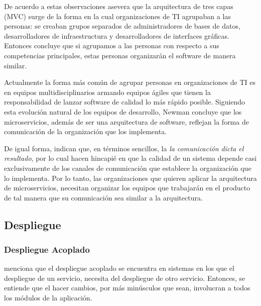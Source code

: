 
De acuerdo a estas observaciones \cite{newman2019monolith} asevera que la arquitectura de tres capas
(MVC) surge de la forma en la cual organizaciones de TI agrupaban a las personas: se creaban grupos
separados de administradores de bases de datos, desarrolladores de infraestructura y desarrolladores
de interfaces gráficas. Entonces concluye que si agrupamos a las personas con respecto a sus competencias
principales, estas personas organizarán el software de manera similar.

Actualmente la forma más común de agrupar personas en organizaciones de TI es en equipos multidisciplinarios
armando equipos ágiles que tienen la responsabilidad de lanzar software de calidad lo más rápido posible.
Siguiendo esta evolución natural de los equipos de desarrollo, Newman concluye que los microservicios,
además de ser una arquitectura de software, reflejan la forma de comunicación de la organización
que los implementa.

De igual forma, \cite{nadareishvili2016microservice} indican que, en términos sencillos, la
{\it la comunicación dicta el resultado}, por lo cual hacen hincapié en que la calidad de un sistema
depende casi exclusivamente de los canales de comunicación que establece la organización que lo implementa.
Por lo tanto, las organizaciones que quieren aplicar la arquitectura de microservicios, necesitan
organizar los equipos que trabajarán en el producto de tal manera que su comunicación sea similar a 
la arquitectura.


\subsection{Despliegue}


\subsubsection{Despliegue Acoplado}

\cite{newman2019monolith} menciona que el despliegue acoplado se encuentra en sistemas en los que el
despliegue de un servicio, necesita del despliegue de otro servicio.
Entonces, se entiende que el hacer cambios, por más minúsculos que sean, involucran a todos los módulos
de la aplicación.

